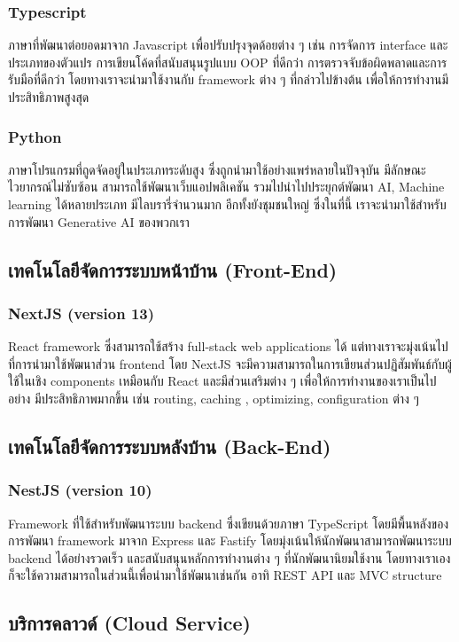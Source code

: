 \subsubsection{Typescript}
ภาษาที่พัฒนาต่อยอดมาจาก Javascript เพื่อปรับปรุงจุดด้อยต่าง ๆ เช่น การจัดการ 
interface และประเภทของตัวแปร การเขียนโค้ดที่สนับสนุนรูปแบบ OOP ที่ดีกว่า 
การตรวจจับข้อผิดพลาดและการรับมือที่ดีกว่า โดยทางเราจะนำมาใช้งานกับ framework 
ต่าง ๆ ที่กล่าวไปข้างต้น เพื่อให้การทำงานมีประสิทธิภาพสูงสุด
\subsubsection{Python}
ภาษาโปรแกรมที่ถูดจัดอยู่ในประเภทระดับสูง ซึ่งถูกนำมาใช้อย่างแพร่หลายในปัจจุบัน 
มีลักษณะไวยากรณ์ไม่ซับซ้อน สามารถใช้พัฒนาเว็บแอปพลิเคชัน 
รวมไปนำไปประยุกต์พัฒนา AI, Machine learning ได้หลายประเภท 
มีไลบรารี่จำนวนมาก อีกทั้งยังชุมชนใหญ่ ซึ่งในที่นี้ เราจะนำมาใช้สำหรับการพัฒนา 
Generative AI ของพวกเรา

\subsection{เทคโนโลยีจัดการระบบหน้าบ้าน (Front-End)}
\subsubsection{NextJS (version 13)}
React framework ซึ่งสามารถใช้สร้าง full-stack web applications ได้ 
แต่ทางเราจะมุ่งเน้นไปที่การนำมาใช้พัฒนาส่วน frontend โดย NextJS 
จะมีความสามารถในการเขียนส่วนปฏิสัมพันธ์กับผู้ใช้ในเชิง components 
เหมือนกับ React และมีส่วนเสริมต่าง ๆ เพื่อให้การทำงานของเราเป็นไปอย่าง
มีประสิทธิภาพมากขึ้น เช่น routing, caching , optimizing, configuration 
ต่าง ๆ

\subsection{เทคโนโลยีจัดการระบบหลังบ้าน (Back-End)}
\subsubsection{NestJS (version 10)}
Framework ที่ใช้สำหรับพัฒนาระบบ backend ซึ่งเขียนด้วยภาษา TypeScript 
โดยมีพื้นหลังของการพัฒนา framework มาจาก Express และ Fastify 
โดยมุ่งเน้นให้นักพัฒนาสามารถพัฒนาระบบ backend ได้อย่างรวดเร็ว 
และสนับสนุนหลักการทำงานต่าง ๆ ที่นักพัฒนานิยมใช้งาน 
โดยทางเราเองก็จะใช้ความสามารถในส่วนนี้เพื่อนำมาใช้พัฒนาเช่นกัน อาทิ REST API 
และ MVC structure

\subsection{บริการคลาวด์ (Cloud Service)}
